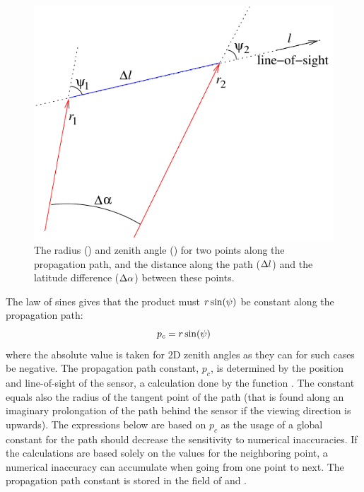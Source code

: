 \begin{figure}[!t]
 \begin{center}
  \begin{minipage}[c]{0.65\textwidth}
   \begin{center}
    \includegraphics*[width=0.9\hsize]{Figs/ppath/geom1d}
   \end{center}
  \end{minipage}%
  \begin{minipage}[c]{0.35\textwidth}
   \caption{The radius (\Rds) and zenith angle (\ZntAng) for two points along
     the propagation path, and the distance along the path ($\Delta l$)
     and the latitude difference ($\Delta\alpha$) between these points.}
   \label{fig:ppath:1d2dgeom}
  \end{minipage}
 \end{center}
\end{figure}   

The law of sines gives that the product must $r\sin(\psi)$ be
constant along the propagation path:
\begin{equation}
  p_c = r\sin(\psi)
  \label{eq:ppath:geomconst}
\end{equation}
where the absolute value is taken for 2D zenith angles as they can for
such cases be negative. The propagation path constant, $p_c$, is
determined by the position and line-of-sight of the sensor, a
calculation done by the function . The
constant equals also the radius of the tangent point of the path (that
is found along an imaginary prolongation of the path behind the sensor
if the viewing direction is upwards). The expressions below are based
on $p_c$ as the usage of a global constant for the path should
decrease the sensitivity to numerical inaccuracies. If the
calculations are based solely on the values for the neighboring
point, a numerical inaccuracy can accumulate when going from one point
to next. The propagation path constant is stored in the field
 of  and .

